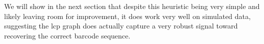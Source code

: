 We will show in the next section that despite this heuristic being very simple and likely leaving  room for improvement, it does work very well on simulated data, suggesting the lcp graph does actually capture a very robust signal toward recovering the correct barcode sequence.




